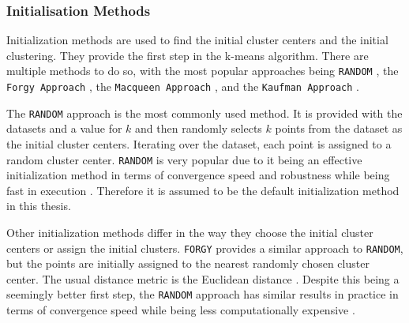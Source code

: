 \subsubsection{Initialisation Methods}
\label{subsec:initialisation_methods}
Initialization methods are used to find the initial cluster centers and the initial clustering.
They provide the first step in the k-means algorithm.
There are multiple methods to do so, with the most popular approaches being \texttt{RANDOM} \cite{PEN-ECI}, the \texttt{Forgy Approach} \cite{AND-CAA}, the \texttt{Macqueen Approach} \cite{MCQ-MCA}, and the \texttt{Kaufman Approach} \cite{KAU-FGD}.

The \texttt{RANDOM} approach is the most commonly used method.
It is provided with the datasets and a value for $k$ and then randomly selects $k$ points from the dataset as the initial cluster centers.
Iterating over the dataset, each point is assigned to a random cluster center.
\texttt{RANDOM} is very popular due to it being an effective initialization method in terms of convergence speed and robustness while being fast in execution \cite{PEN-ECI}.
Therefore it is assumed to be the default initialization method in this thesis.

Other initialization methods differ in the way they choose the initial cluster centers or assign the initial clusters.
\texttt{FORGY} provides a similar approach to \texttt{RANDOM}, but the points are initially assigned to the nearest randomly chosen cluster center.
The usual distance metric is the Euclidean distance \cite{AND-CAA}.
Despite this being a seemingly better first step, the \texttt{RANDOM} approach has similar results in practice in terms of convergence speed while being less computationally expensive \cite{AND-CAA}.

